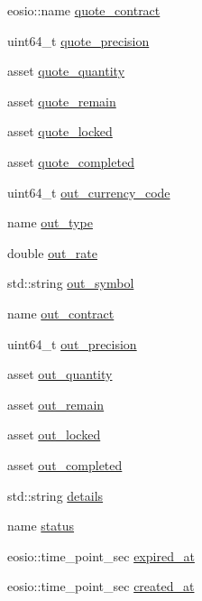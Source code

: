 \begin{DoxyCompactItemize}
eosio\+::name \mbox{\hyperlink{structp2p_1_1orders_a033746dfead78477824e8ae920505faa}{quote\+\_\+contract}}
\item 
uint64\+\_\+t \mbox{\hyperlink{structp2p_1_1orders_af823490b297c8135453f15277efbf294}{quote\+\_\+precision}}
\item 
asset \mbox{\hyperlink{structp2p_1_1orders_aaeba745745fe627561e3b9b608443c7f}{quote\+\_\+quantity}}
\item 
asset \mbox{\hyperlink{structp2p_1_1orders_a62f809bf29bcd440512ef3d508232ac0}{quote\+\_\+remain}}
\item 
asset \mbox{\hyperlink{structp2p_1_1orders_a1c5f68d399cb96227e42833374aee105}{quote\+\_\+locked}}
\item 
asset \mbox{\hyperlink{structp2p_1_1orders_ad4da8c4849fb7f2488e3e000f9461002}{quote\+\_\+completed}}
\item 
uint64\+\_\+t \mbox{\hyperlink{structp2p_1_1orders_af4327f5bcde3db4dd60cfdd6ddce7611}{out\+\_\+currency\+\_\+code}}
\item 
name \mbox{\hyperlink{structp2p_1_1orders_ad8c0bf06458e15a53a06e404e2e2130d}{out\+\_\+type}}
\item 
double \mbox{\hyperlink{structp2p_1_1orders_a3208416b574632d2aaef6c138223a0ea}{out\+\_\+rate}}
\item 
std\+::string \mbox{\hyperlink{structp2p_1_1orders_a726223d82cdc43e2b734cf673835c582}{out\+\_\+symbol}}
\item 
name \mbox{\hyperlink{structp2p_1_1orders_a48670835e7e5bd889473a81c3fafbbd2}{out\+\_\+contract}}
\item 
uint64\+\_\+t \mbox{\hyperlink{structp2p_1_1orders_ae6b70d5a03f4d20a0ccf199e4ebf5af5}{out\+\_\+precision}}
\item 
asset \mbox{\hyperlink{structp2p_1_1orders_ab1b872e009bc0f52603ba2b54c521c1a}{out\+\_\+quantity}}
\item 
asset \mbox{\hyperlink{structp2p_1_1orders_ad375146e4c5f03d42250be97b8d43cde}{out\+\_\+remain}}
\item 
asset \mbox{\hyperlink{structp2p_1_1orders_ae159e6986c8beaf43892ca85f9c702d5}{out\+\_\+locked}}
\item 
asset \mbox{\hyperlink{structp2p_1_1orders_ae63f9eba373c1c401e5326db46625068}{out\+\_\+completed}}
\item 
std\+::string \mbox{\hyperlink{structp2p_1_1orders_a223eac1f67f878e4bfc3c3918deadcfc}{details}}
\item 
name \mbox{\hyperlink{structp2p_1_1orders_a0a4acd537d4a6ac966469faa648b43f2}{status}}
\item 
eosio\+::time\+\_\+point\+\_\+sec \mbox{\hyperlink{structp2p_1_1orders_afe3f0c2fcb252679efbd4143fc86d42d}{expired\+\_\+at}}
\item 
eosio\+::time\+\_\+point\+\_\+sec \mbox{\hyperlink{structp2p_1_1orders_afb5f4469a9ae8b84da84b287853ceb42}{created\+\_\+at}}
\end{DoxyCompactItemize}



